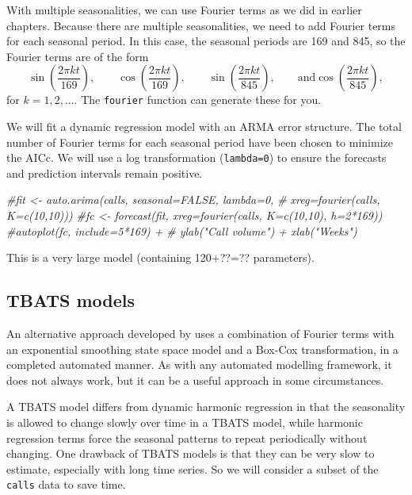 \documentclass[]{book}
\newenvironment{Shaded}{\begin{snugshade}}{\end{snugshade}}
\newcommand{\CommentTok}[1]{\textcolor[rgb]{0.56,0.35,0.01}{\textit{#1}}}
\begin{document}
With multiple seasonalities, we can use Fourier terms as we did in earlier chapters. Because there are multiple seasonalities, we need to add Fourier terms for each seasonal period. In this case, the seasonal periods are 169 and 845, so the Fourier terms are of the form
\[
  \sin\left(\frac{2\pi kt}{169}\right), \qquad
  \cos\left(\frac{2\pi kt}{169}\right), \qquad
  \sin\left(\frac{2\pi kt}{845}\right), \qquad  \text{and}
  \cos\left(\frac{2\pi kt}{845}\right),
\]
for \(k=1,2,\dots\). The \texttt{fourier} function can generate these for you.

We will fit a dynamic regression model with an ARMA error structure. The total number of Fourier terms for each seasonal period have been chosen to minimize the AICc. We will use a log transformation (\texttt{lambda=0}) to ensure the forecasts and prediction intervals remain positive.

\begin{Shaded}
\begin{Highlighting}[]
\CommentTok{#fit <- auto.arima(calls, seasonal=FALSE, lambda=0,}
\CommentTok{#         xreg=fourier(calls, K=c(10,10)))}
\CommentTok{#fc <- forecast(fit, xreg=fourier(calls, K=c(10,10), h=2*169))}
\CommentTok{#autoplot(fc, include=5*169) +}
\CommentTok{#  ylab("Call volume") + xlab("Weeks")}
\end{Highlighting}
\end{Shaded}

This is a very large model (containing 120+??=?? parameters).

\hypertarget{tbats-models}{%
\subsection*{TBATS models}\label{tbats-models}}

An alternative approach developed by \citet{DHS11} uses a combination of Fourier terms with an exponential smoothing state space model and a Box-Cox transformation, in a completed automated manner. As with any automated modelling framework, it does not always work, but it can be a useful approach in some circumstances.

A TBATS model differs from dynamic harmonic regression in that the seasonality is allowed to change slowly over time in a TBATS model, while harmonic regression terms force the seasonal patterns to repeat periodically without changing. One drawback of TBATS models is that they can be very slow to estimate, especially with long time series. So we will consider a subset of the \texttt{calls} data to save time.
\end{document}
